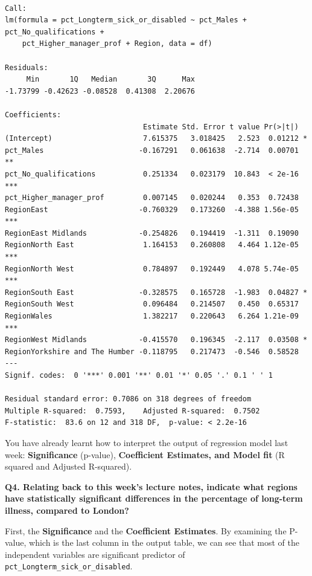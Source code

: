 \documentclass[
  letterpaper,
  DIV=11,
  numbers=noendperiod]{scrreprt}
\begin{document}
\begin{verbatim}

Call:
lm(formula = pct_Longterm_sick_or_disabled ~ pct_Males + pct_No_qualifications + 
    pct_Higher_manager_prof + Region, data = df)

Residuals:
     Min       1Q   Median       3Q      Max 
-1.73799 -0.42623 -0.08528  0.41308  2.20676 

Coefficients:
                                Estimate Std. Error t value Pr(>|t|)    
(Intercept)                     7.615375   3.018425   2.523  0.01212 *  
pct_Males                      -0.167291   0.061638  -2.714  0.00701 ** 
pct_No_qualifications           0.251334   0.023179  10.843  < 2e-16 ***
pct_Higher_manager_prof         0.007145   0.020244   0.353  0.72438    
RegionEast                     -0.760329   0.173260  -4.388 1.56e-05 ***
RegionEast Midlands            -0.254826   0.194419  -1.311  0.19090    
RegionNorth East                1.164153   0.260808   4.464 1.12e-05 ***
RegionNorth West                0.784897   0.192449   4.078 5.74e-05 ***
RegionSouth East               -0.328575   0.165728  -1.983  0.04827 *  
RegionSouth West                0.096484   0.214507   0.450  0.65317    
RegionWales                     1.382217   0.220643   6.264 1.21e-09 ***
RegionWest Midlands            -0.415570   0.196345  -2.117  0.03508 *  
RegionYorkshire and The Humber -0.118795   0.217473  -0.546  0.58528    
---
Signif. codes:  0 '***' 0.001 '**' 0.01 '*' 0.05 '.' 0.1 ' ' 1

Residual standard error: 0.7086 on 318 degrees of freedom
Multiple R-squared:  0.7593,    Adjusted R-squared:  0.7502 
F-statistic:  83.6 on 12 and 318 DF,  p-value: < 2.2e-16
\end{verbatim}

You have already learnt how to interpret the output of regression model
last week: \textbf{Significance} (p-value), \textbf{Coefficient
Estimates, and Model fit} (R squared and Adjusted R-squared).

\textbf{Q4. Relating back to this week's lecture notes, indicate what
regions have statistically significant differences in the percentage of
long-term illness, compared to London?}

First, the \textbf{Significance} and the \textbf{Coefficient Estimates}.
By examining the P-value, which is the last column in the output table,
we can see that most of the independent variables are significant
predictor of \texttt{pct\_Longterm\_sick\_or\_disabled}.
\end{document}

